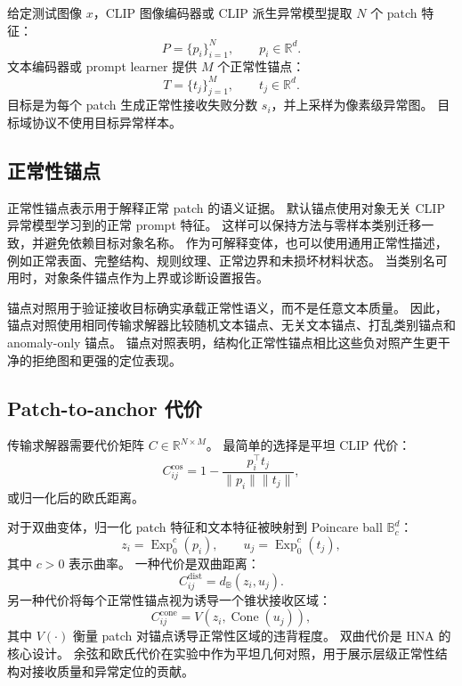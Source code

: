 \documentclass[10pt,fontset=none]{ctexart}
\newcommand{\method}{HNA}
\begin{document}
给定测试图像 $x$，CLIP 图像编码器或 CLIP 派生异常模型提取 $N$ 个 patch 特征：
\begin{equation}
    P = \{p_i\}_{i=1}^{N}, \qquad p_i \in \mathbb{R}^{d}.
\end{equation}
文本编码器或 prompt learner 提供 $M$ 个正常性锚点：
\begin{equation}
    T = \{t_j\}_{j=1}^{M}, \qquad t_j \in \mathbb{R}^{d}.
\end{equation}
目标是为每个 patch 生成正常性接收失败分数 $s_i$，并上采样为像素级异常图。
目标域协议不使用目标异常样本。

\subsection{正常性锚点}

正常性锚点表示用于解释正常 patch 的语义证据。
默认锚点使用对象无关 CLIP 异常模型学习到的正常 prompt 特征。
这样可以保持方法与零样本类别迁移一致，并避免依赖目标对象名称。
作为可解释变体，也可以使用通用正常性描述，例如正常表面、完整结构、规则纹理、正常边界和未损坏材料状态。
当类别名可用时，对象条件锚点作为上界或诊断设置报告。

锚点对照用于验证接收目标确实承载正常性语义，而不是任意文本质量。
因此，锚点对照使用相同传输求解器比较随机文本锚点、无关文本锚点、打乱类别锚点和 anomaly-only 锚点。
锚点对照表明，结构化正常性锚点相比这些负对照产生更干净的拒绝图和更强的定位表现。

\subsection{Patch-to-anchor 代价}

传输求解器需要代价矩阵 $C \in \mathbb{R}^{N \times M}$。
最简单的选择是平坦 CLIP 代价：
\begin{equation}
    C_{ij}^{\mathrm{cos}} = 1 - \frac{p_i^{\top}t_j}{\|p_i\|\|t_j\|},
\end{equation}
或归一化后的欧氏距离。

对于双曲变体，归一化 patch 特征和文本特征被映射到 Poincare ball $\mathbb{B}^{d}_{c}$：
\begin{equation}
    z_i = \operatorname{Exp}^{c}_{0}(p_i), \qquad
    u_j = \operatorname{Exp}^{c}_{0}(t_j),
\end{equation}
其中 $c>0$ 表示曲率。
一种代价是双曲距离：
\begin{equation}
    C_{ij}^{\mathrm{dist}} = d_{\mathbb{B}}(z_i, u_j).
\end{equation}
另一种代价将每个正常性锚点视为诱导一个锥状接收区域：
\begin{equation}
    C_{ij}^{\mathrm{cone}} = V(z_i, \operatorname{Cone}(u_j)),
\end{equation}
其中 $V(\cdot)$ 衡量 patch 对锚点诱导正常性区域的违背程度。
双曲代价是 \method{} 的核心设计。
余弦和欧氏代价在实验中作为平坦几何对照，用于展示层级正常性结构对接收质量和异常定位的贡献。
\end{document}
